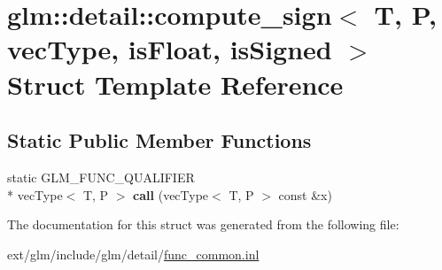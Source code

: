 \hypertarget{structglm_1_1detail_1_1compute__sign}{\section{glm\-:\-:detail\-:\-:compute\-\_\-sign$<$ T, P, vec\-Type, is\-Float, is\-Signed $>$ Struct Template Reference}
\label{structglm_1_1detail_1_1compute__sign}
}
\subsection*{Static Public Member Functions}
\begin{DoxyCompactItemize}
\item 
\hypertarget{structglm_1_1detail_1_1compute__sign_aa7efec90c8354b6b019f200bb44ceba3}{static G\-L\-M\-\_\-\-F\-U\-N\-C\-\_\-\-Q\-U\-A\-L\-I\-F\-I\-E\-R \\*
vec\-Type$<$ T, P $>$ {\bfseries call} (vec\-Type$<$ T, P $>$ const \&x)}\label{structglm_1_1detail_1_1compute__sign_aa7efec90c8354b6b019f200bb44ceba3}

\end{DoxyCompactItemize}


The documentation for this struct was generated from the following file\-:\begin{DoxyCompactItemize}
\item 
ext/glm/include/glm/detail/\hyperlink{func__common_8inl}{func\-\_\-common.\-inl}\end{DoxyCompactItemize}
